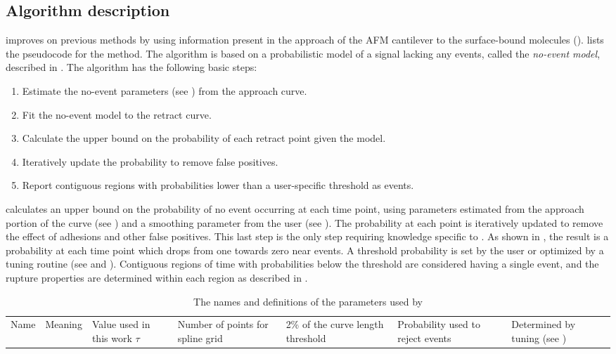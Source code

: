 \subsection{Algorithm description}

\name{} improves on previous methods by using information present in the approach of the AFM cantilever to the surface-bound molecules ().   lists the pseudocode for the method. The algorithm is based on a probabilistic model of a signal lacking any events, called the \textit{no-event model}, described in . The algorithm has the following basic steps:

\begin{enumerate}
\item Estimate the no-event parameters (see ) from the approach curve.
\item Fit the no-event model to the retract curve.
\item Calculate the upper bound on the probability of each retract point given the model.
\item Iteratively update the probability to remove false positives.
\item Report contiguous regions with probabilities lower than a user-specific threshold as events.
\end{enumerate}

 \name{} calculates an upper bound on the probability of no event occurring at each time point, using parameters estimated from the approach portion of the curve (see ) and a smoothing parameter from the user (see ). The probability at each point is iteratively updated to remove the effect of adhesions and other false positives. This last step is the only step requiring knowledge specific to \singlemol{}. As shown in , the result is a probability at each time point which drops from one towards zero near events. A threshold probability is set by the user or optimized by a tuning routine (see  and ). Contiguous regions of time with probabilities below the threshold are considered having a single event, and the rupture properties are determined within each region as described in .


\begin{table}
\caption[Algorithm parameters]{ The names and definitions of the parameters used by \name{}}
\begin{tabularx}{\textwidth}{ l | l | l | l  }
\hline \hline
Name & Meaning  & Value used in this work \e
$\tau$ & Number of points for spline grid & 2\% of the curve length \e
threshold & Probability used to reject events  & Determined by tuning (see ) \e
\end{tabularx}
\end{table}


